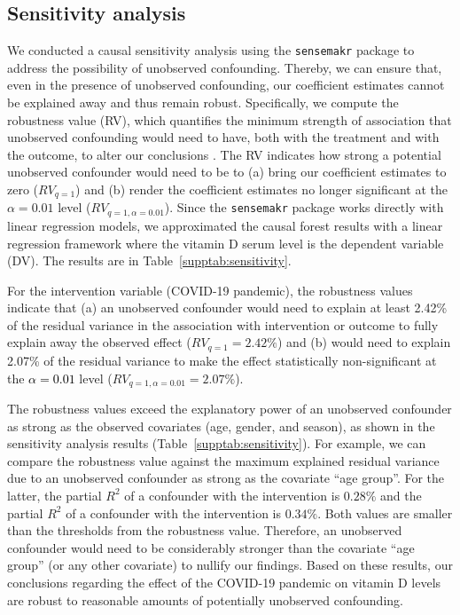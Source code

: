\documentclass[12pt]{article}
\newcommand{\REV}[1]{\textcolor{black}{#1}}
\begin{document}
\begin{appendices}
\begin{table}
\vspace{0.5cm}
\end{table}


\newpage
    
\section{Sensitivity analysis}
\label{supp:sensitivity_analysis}

We conducted a causal sensitivity analysis using the \texttt{sensemakr} package \cite{Cinelli2020} to address the possibility of unobserved confounding. Thereby, we can ensure that, even in the presence of unobserved confounding, our coefficient estimates cannot be explained away and thus remain robust. Specifically, we compute the robustness value (RV), which quantifies the minimum strength of association that unobserved confounding would need to have, both with the treatment and with the outcome, to alter our conclusions \cite{Cinelli2020}. The RV indicates how strong a potential unobserved confounder would need to be to (a) bring our coefficient estimates to zero ($RV_{q=1}$) and (b) render the coefficient estimates no longer significant at the $\alpha = 0.01$ level ($RV_{q=1,\alpha=0.01}$). Since the \texttt{sensemakr} package works directly with linear regression models, we approximated the causal forest results with a linear regression framework where the vitamin D serum level is the dependent variable (DV). The results are in Table~\ref{supptab:sensitivity}. 

For the intervention variable (COVID-19 pandemic), the robustness values indicate that (a) an unobserved confounder would need to explain at least 2.42\% of the residual variance in the association with intervention or outcome to fully explain away the observed effect ($RV_{q=1} = 2.42\%$) and (b) would need to explain 2.07\% of the residual variance to make the effect statistically non-significant at the \REV{$\alpha = 0.01$} level ($RV_{q=1,\alpha=0.01} = 2.07\%$). 

The robustness values exceed the explanatory power of an unobserved confounder as strong as the observed covariates (age, gender, and season), as shown in the sensitivity analysis results (Table~\ref{supptab:sensitivity}). For example, we can compare the robustness value against the maximum explained residual variance due to an unobserved confounder as strong as the covariate ``age group''. For the latter, the partial $R^2$ of a confounder with the intervention is $0.28\%$ and the partial $R^2$ of a confounder with the intervention is $0.34\%$. Both values are smaller than the thresholds from the robustness value. Therefore, an unobserved confounder would need to be considerably stronger than the covariate ``age group'' (or any other covariate) to nullify our findings. Based on these results, our conclusions regarding the effect of the COVID-19 pandemic on vitamin D levels are robust to reasonable amounts of potentially unobserved confounding.


\end{appendices}
\end{document}
